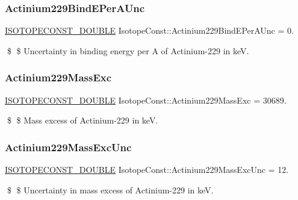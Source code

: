 \subsubsection{\texorpdfstring{Actinium229\+Bind\+E\+Per\+A\+Unc}{Actinium229BindEPerAUnc}}
{\footnotesize\ttfamily \mbox{\hyperlink{group___isotope_const-_macros_ga8f45a7272ce02c0b4c65c44636ed719a}{I\+S\+O\+T\+O\+P\+E\+C\+O\+N\+S\+T\+\_\+\+D\+O\+U\+B\+LE}} Isotope\+Const\+::\+Actinium229\+Bind\+E\+Per\+A\+Unc = 0.}

\$ \$ Uncertainty in binding energy per A of Actinium-\/229 in keV. \mbox{\label{group___isotope_const-_actinium-_ac229_gaf615c63587c57ac4ab89bbd935eb1d82}} 
\subsubsection{\texorpdfstring{Actinium229\+Mass\+Exc}{Actinium229MassExc}}
{\footnotesize\ttfamily \mbox{\hyperlink{group___isotope_const-_macros_ga8f45a7272ce02c0b4c65c44636ed719a}{I\+S\+O\+T\+O\+P\+E\+C\+O\+N\+S\+T\+\_\+\+D\+O\+U\+B\+LE}} Isotope\+Const\+::\+Actinium229\+Mass\+Exc = 30689.}

\$ \$ Mass excess of Actinium-\/229 in keV. \mbox{\label{group___isotope_const-_actinium-_ac229_gae7e5f51f6d18af6f0fbacc61239e2d60}} 
\subsubsection{\texorpdfstring{Actinium229\+Mass\+Exc\+Unc}{Actinium229MassExcUnc}}
{\footnotesize\ttfamily \mbox{\hyperlink{group___isotope_const-_macros_ga8f45a7272ce02c0b4c65c44636ed719a}{I\+S\+O\+T\+O\+P\+E\+C\+O\+N\+S\+T\+\_\+\+D\+O\+U\+B\+LE}} Isotope\+Const\+::\+Actinium229\+Mass\+Exc\+Unc = 12.}

\$ \$ Uncertainty in mass excess of Actinium-\/229 in keV. \mbox{\label{group___isotope_const-_actinium-_ac229_ga231e6fec1b379981ea430a5bf9cdddff}} 
